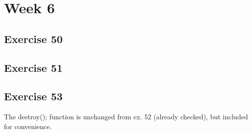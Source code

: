 \documentclass[a4paper]{article}
\let\stdsection\section
\renewcommand\section{\newpage\stdsection}
\begin{document}
\section*{Week 6}

\subsection*{Exercise 50}

















\newpage
\subsection*{Exercise 51}


\newpage
\subsection*{Exercise 53}






The destroy(); function is unchanged from ex. 52 (already checked), but included for convenience.




\end{document}

